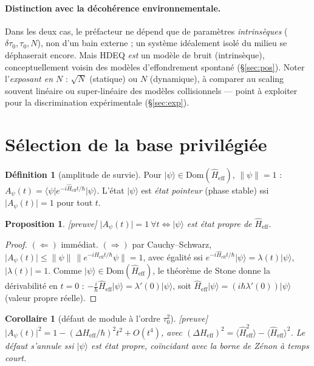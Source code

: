 \documentclass[11pt,a4paper]{article}
\newcommand{\ket}[1]{\lvert #1\rangle}
\newcommand{\bra}[1]{\langle #1\rvert}
\newcommand{\Heff}{\hat{H}_{\mathrm{eff}}}
\newcommand{\statut}[1]{{\footnotesize\textsf{[#1]}}}
\theoremstyle{plain}
\newtheorem{proposition}{Proposition}
\newtheorem{corollary}{Corollaire}
\theoremstyle{definition}
\newtheorem{definition}{D\'efinition}
\theoremstyle{remark}
\begin{document}
\paragraph{Distinction avec la d\'ecoh\'erence environnementale.} Dans les deux cas, le
pr\'efacteur ne d\'epend que de param\`etres \emph{intrins\`eques} ($\delta\tau_0,\tau_0,N$),
non d'un bain externe ; un syst\`eme id\'ealement isol\'e du milieu se d\'ephaserait encore.
Mais HDEQ \emph{est} un mod\`ele de bruit (intrins\`eque), conceptuellement voisin des
mod\`eles d'effondrement spontan\'e (\S\ref{sec:pos}). Noter l'\emph{exposant en $N$} :
$\sqrt N$ (statique) ou $N$ (dynamique), \`a comparer au scaling souvent lin\'eaire ou
super-lin\'eaire des mod\`eles collisionnels --- point \`a exploiter pour la
discrimination exp\'erimentale (\S\ref{sec:exp}).

\section{S\'election de la base privil\'egi\'ee}\label{sec:base}

\begin{definition}[amplitude de survie]
Pour $\ket{\psi}\in\mathrm{Dom}(\Heff)$, $\lVert\psi\rVert=1$ :
$A_\psi(t)=\bra{\psi}e^{-i\Heff t/\hbar}\ket{\psi}$. L'\'etat $\ket{\psi}$ est
\emph{\'etat pointeur} (phase stable) ssi $\lvert A_\psi(t)\rvert=1$ pour tout $t$.
\end{definition}

\begin{proposition}\label{prop:base}\statut{preuve}
$\lvert A_\psi(t)\rvert=1\ \forall t\iff\ket{\psi}$ est \'etat propre de $\Heff$.
\end{proposition}
\begin{proof}
$(\Leftarrow)$ imm\'ediat. $(\Rightarrow)$ par Cauchy--Schwarz,
$\lvert A_\psi(t)\rvert\le\lVert\psi\rVert\,\lVert e^{-i\Heff t/\hbar}\psi\rVert=1$,
avec \'egalit\'e ssi $e^{-i\Heff t/\hbar}\ket{\psi}=\lambda(t)\ket{\psi}$,
$\lvert\lambda(t)\rvert=1$. Comme $\ket{\psi}\in\mathrm{Dom}(\Heff)$, le th\'eor\`eme de
Stone donne la d\'erivabilit\'e en $t=0$ :
$-\tfrac{i}{\hbar}\Heff\ket{\psi}=\lambda'(0)\ket{\psi}$, soit
$\Heff\ket{\psi}=(i\hbar\lambda'(0))\ket{\psi}$ (valeur propre r\'eelle).
\end{proof}

\begin{corollary}[d\'efaut de module \`a l'ordre $\tau_0^2$]\statut{preuve}
$\lvert A_\psi(t)\rvert^2=1-(\Delta H_{\mathrm{eff}}/\hbar)^2 t^2+O(t^4)$, avec
$(\Delta H_{\mathrm{eff}})^2=\langle\Heff^2\rangle-\langle\Heff\rangle^2$. Le d\'efaut
s'annule ssi $\ket{\psi}$ est \'etat propre, co\"incidant avec la borne de Zénon \`a
temps court.
\end{corollary}
\end{document}
